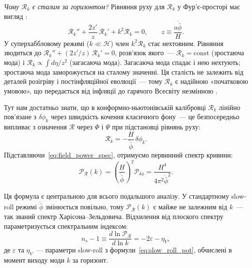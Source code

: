 \documentclass[12pt, a4paper]{article}
\begin{document}
\textit{Чому $\mathcal{R}_k$ є сталим за горизонтом?}
Рівняння руху для $\mathcal{R}_k$ у Фур'є-просторі має вигляд
\cite{bardeen_1980}:
\begin{equation}\label{eq:R_eom}
  \mathcal{R}_k'' + \frac{2z'}{z}\,\mathcal{R}_k' + k^2\mathcal{R}_k = 0,
  \qquad z \equiv \frac{a\dot{\bar\phi}}{H}.
\end{equation}
У суперхаббловому режимі ($k \ll \mathcal{H}$) член $k^2\mathcal{R}_k$
стає нехтовним. Рівняння зводиться до
$\mathcal{R}_k'' + (2z'/z)\,\mathcal{R}_k' = 0$,
розв'язок якого~--- $\mathcal{R}_k = \mathrm{const}$ (зростаюча мода)
і $\mathcal{R}_k \propto \int d\eta/z^2$ (загасаюча мода).
Загасаюча мода спадає і нею нехтують; зростаюча мода заморожується
на сталому значенні. Ця сталість не залежить від деталей розігріву і
постінфляційної еволюції~--- тому $\mathcal{R}_k$ є надійною
«початковою умовою», що передається від інфляції до гарячого
Всесвіту незмінною \cite{bardeen_1980}.

Тут нам достатньо знати, що в конформно-ньютонівській калібровці
$\mathcal{R}_k$ лінійно пов'язане з $\delta\phi_k$ через швидкість
кочення класичного фону~--- це безпосередньо випливає з означення
$\mathcal{R}$ через $\Phi$ і $\Psi$ при підстановці рівнянь руху:
\begin{equation}\label{eq:curvature_perturbation}
  \mathcal{R}_k = -\frac{H}{\dot{\bar{\phi}}}\,\delta\phi_k.
\end{equation}
Підставляючи~\eqref{eq:field_power_spec}, отримуємо первинний
спектр кривини:
\begin{equation}\label{eq:curvature_power_spec}
  \mathcal{P}_{\mathcal{R}}(k)
    = \left(\frac{H}{\dot{\bar{\phi}}}\right)^{\!2}
      \mathcal{P}_{\delta\phi}
    = \frac{H^4}{4\pi^2\dot{\bar{\phi}}^2}.
\end{equation}

Ця формула є центральною для всього подальшого аналізу. У
стандартному slow-roll режимі $\dot{\bar\phi}$ змінюється
повільно, тому $\mathcal{P}_{\mathcal{R}}(k)$ є майже не
залежним від $k$~--- так званий спектр Харісона--Зельдовича.
Відхилення від плоского спектру параметризується спектральним
індексом:
\begin{equation}\label{eq:ns}
  n_s - 1 \equiv \frac{d\ln\mathcal{P}_{\mathcal{R}}}{d\ln k}
            = -2\varepsilon - \eta_V,
\end{equation}
де $\varepsilon$ та $\eta_V$~--- параметри slow-roll з
формули~\eqref{eq:slow_roll_pot}, обчислені в момент виходу
моди $k$ за горизонт.
\end{document}
